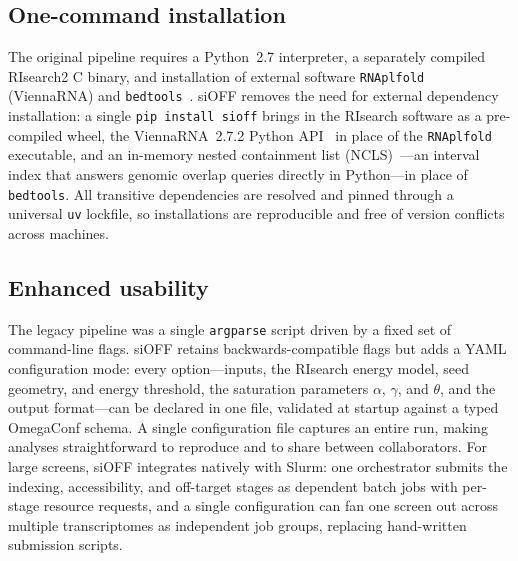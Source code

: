\documentclass[unnumsec,webpdf,contemporary,large]{oup-authoring-template}
\begin{document}
\subsection*{One-command installation}
The original pipeline requires a Python~2.7 interpreter, a separately compiled RIsearch2 C binary, and installation of external software \texttt{RNAplfold} (ViennaRNA) and \texttt{bedtools}~\citep{quinlan2010bedtools}.
siOFF removes the need for external dependency installation: a single \texttt{pip install sioff} brings in the RIsearch software as a pre-compiled wheel, the ViennaRNA~2.7.2 Python API~\citep{lorenz2011vienna} in place of the \texttt{RNAplfold} executable, and an in-memory nested containment list (NCLS)~\citep{ncls}---an interval index that answers genomic overlap queries directly in Python---in place of \texttt{bedtools}.
All transitive dependencies are resolved and pinned through a universal \texttt{uv} lockfile, so installations are reproducible and free of version conflicts across machines.

\subsection*{Enhanced usability}
The legacy pipeline was a single \texttt{argparse} script driven by a fixed set of command-line flags.
siOFF retains backwards-compatible flags but adds a YAML configuration mode: every option---inputs, the RIsearch energy model, seed geometry, and energy threshold, the saturation parameters $\alpha$, $\gamma$, and $\theta$, and the output format---can be declared in one file, validated at startup against a typed OmegaConf schema.
A single configuration file captures an entire run, making analyses straightforward to reproduce and to share between collaborators.
For large screens, siOFF integrates natively with Slurm: one orchestrator submits the indexing, accessibility, and off-target stages as dependent batch jobs with per-stage resource requests, and a single configuration can fan one screen out across multiple transcriptomes as independent job groups, replacing hand-written submission scripts.
\end{document}
